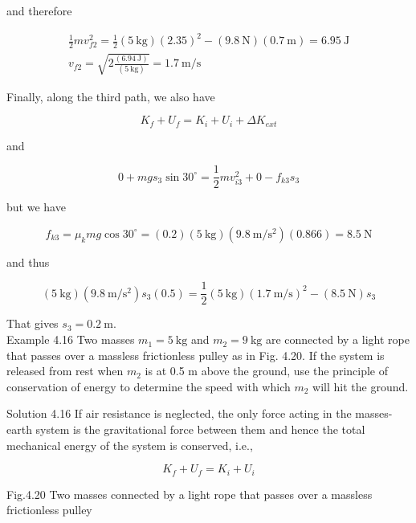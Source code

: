 \documentclass[10pt]{article}
\begin{document}
and therefore

$$
\begin{gathered}
\frac{1}{2} m v_{f 2}^{2}=\frac{1}{2}(5 \mathrm{~kg})(2.35)^{2}-(9.8 \mathrm{~N})(0.7 \mathrm{~m})=6.95 \mathrm{~J} \\
v_{f 2}=\sqrt{2 \frac{(6.94 \mathrm{~J})}{(5 \mathrm{~kg})}}=1.7 \mathrm{~m} / \mathrm{s}
\end{gathered}
$$

Finally, along the third path, we also have

$$
K_{f}+U_{f}=K_{i}+U_{i}+\Delta K_{e x t}
$$

and

$$
0+m g s_{3} \sin 30^{\circ}=\frac{1}{2} m v_{i 3}^{2}+0-f_{k 3} s_{3}
$$

but we have

$$
f_{k 3}=\mu_{k} m g \cos 30^{\circ}=(0.2)(5 \mathrm{~kg})\left(9.8 \mathrm{~m} / \mathrm{s}^{2}\right)(0.866)=8.5 \mathrm{~N}
$$

and thus

$$
(5 \mathrm{~kg})\left(9.8 \mathrm{~m} / \mathrm{s}^{2}\right) s_{3}(0.5)=\frac{1}{2}(5 \mathrm{~kg})(1.7 \mathrm{~m} / \mathrm{s})^{2}-(8.5 \mathrm{~N}) s_{3}
$$

That gives $s_{3}=0.2 \mathrm{~m}$.\\
Example 4.16 Two masses $m_{1}=5 \mathrm{~kg}$ and $m_{2}=9 \mathrm{~kg}$ are connected by a light rope that passes over a massless frictionless pulley as in Fig. 4.20. If the system is released from rest when $m_{2}$ is at 0.5 m above the ground, use the principle of conservation of energy to determine the speed with which $m_{2}$ will hit the ground.

Solution 4.16 If air resistance is neglected, the only force acting in the masses-earth system is the gravitational force between them and hence the total mechanical energy of the system is conserved, i.e.,

$$
K_{f}+U_{f}=K_{i}+U_{i}
$$

Fig.4.20 Two masses connected by a light rope that passes over a massless frictionless pulley
\end{document}
